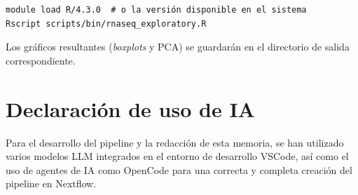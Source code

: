 \documentclass[11pt,a4paper]{article}
\begin{document}
\begin{verbatim}
module load R/4.3.0  # o la versión disponible en el sistema
Rscript scripts/bin/rnaseq_exploratory.R
\end{verbatim}

Los gráficos resultantes (\textit{boxplots} y PCA) se guardarán en el directorio de salida correspondiente.

\section*{Declaración de uso de IA}
Para el desarrollo del pipeline y la redacción de esta memoria, se han utilizado varios modelos LLM integrados en el entorno de desarrollo VSCode, así como el uso de agentes de IA como OpenCode para una correcta y completa creación del pipeline en Nextflow.
\end{document}
